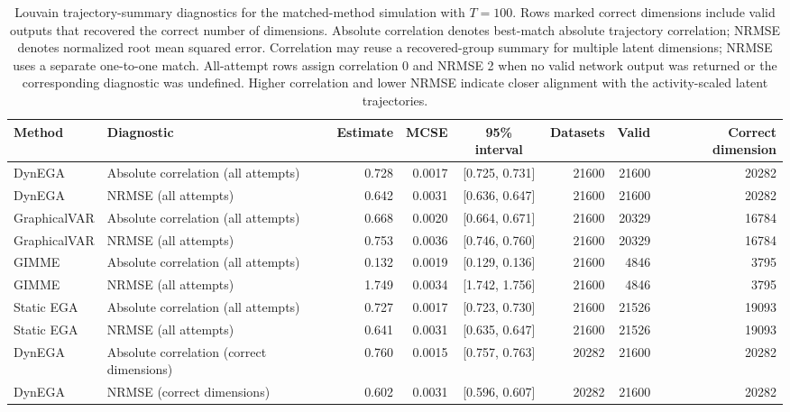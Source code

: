 \documentclass[
]{article}
\begin{document}
\begin{landscape}\scriptsize{}\setlength{\tabcolsep}{3pt}
\begin{table}

\caption{\label{tab:trajectory-t100}Louvain trajectory-summary diagnostics for the matched-method simulation with $T=100$. Rows marked correct dimensions include valid outputs that recovered the correct number of dimensions. Absolute correlation denotes best-match absolute trajectory correlation; NRMSE denotes normalized root mean squared error. Correlation may reuse a recovered-group summary for multiple latent dimensions; NRMSE uses a separate one-to-one match. All-attempt rows assign correlation 0 and NRMSE 2 when no valid network output was returned or the corresponding diagnostic was undefined. Higher correlation and lower NRMSE indicate closer alignment with the activity-scaled latent trajectories.}
\centering
\begin{tabular}[t]{p{1.00in}p{2.85in}rrcrrr}
\toprule
Method & Diagnostic & Estimate & MCSE & 95\% interval & Datasets & Valid & Correct dimension\\
\midrule
DynEGA & Absolute correlation (all attempts) & 0.728 & 0.0017 & {}[0.725, 0.731] & 21600 & 21600 & 20282\\
DynEGA & NRMSE (all attempts) & 0.642 & 0.0031 & {}[0.636, 0.647] & 21600 & 21600 & 20282\\
GraphicalVAR & Absolute correlation (all attempts) & 0.668 & 0.0020 & {}[0.664, 0.671] & 21600 & 20329 & 16784\\
GraphicalVAR & NRMSE (all attempts) & 0.753 & 0.0036 & {}[0.746, 0.760] & 21600 & 20329 & 16784\\
GIMME & Absolute correlation (all attempts) & 0.132 & 0.0019 & {}[0.129, 0.136] & 21600 & 4846 & 3795\\
\addlinespace
GIMME & NRMSE (all attempts) & 1.749 & 0.0034 & {}[1.742, 1.756] & 21600 & 4846 & 3795\\
Static EGA & Absolute correlation (all attempts) & 0.727 & 0.0017 & {}[0.723, 0.730] & 21600 & 21526 & 19093\\
Static EGA & NRMSE (all attempts) & 0.641 & 0.0031 & {}[0.635, 0.647] & 21600 & 21526 & 19093\\
DynEGA & Absolute correlation (correct dimensions) & 0.760 & 0.0015 & {}[0.757, 0.763] & 20282 & 21600 & 20282\\
DynEGA & NRMSE (correct dimensions) & 0.602 & 0.0031 & {}[0.596, 0.607] & 20282 & 21600 & 20282\\

\end{tabular}
\end{table}
\end{landscape}
\end{document}
